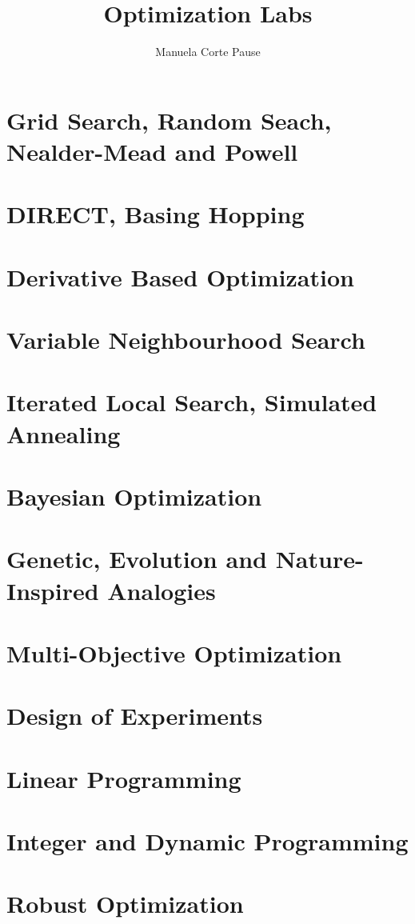 \documentclass{article}
\title{Optimization Labs}
\author{Manuela Corte Pause}
\begin{document}
\maketitle

\tableofcontents
\newpage

\section{Grid Search, Random Seach, Nealder-Mead and Powell}

\newpage

\section{DIRECT, Basing Hopping}

\newpage

\section{Derivative Based Optimization}

\newpage

\section{Variable Neighbourhood Search}

\newpage

\section{Iterated Local Search, Simulated Annealing}

\newpage

\section{Bayesian Optimization}

\newpage

\section{Genetic, Evolution and Nature-Inspired Analogies}

\newpage

\section{Multi-Objective Optimization}

\newpage

\section{Design of Experiments}

\newpage

\section{Linear Programming}

\newpage

\section{Integer and Dynamic Programming}

\newpage

\section{Robust Optimization}

\end{document}
